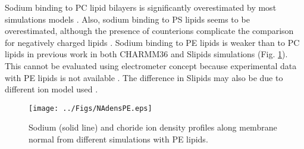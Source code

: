 \documentclass[aps,prl,superscriptaddress,twocolumn]{revtex4}
\begin{document}
Sodium binding to PC lipid bilayers is significantly overestimated by most simulations models \cite{catte16}.
Also, sodium binding to PS lipids seems to be overestimated, although the
presence of counterions complicate the comparison for negatively charged lipids \cite{NMRlipidsIVps}.
Sodium binding to PE lipids is weaker than to PC lipids in previous work \cite{catte16} in both CHARMM36 and Slipids simulations (Fig. \ref{NAdensPE}).
This cannot be evaluated using electrometer concept because experimental data with PE lipids is not
available .
The difference in Slipids may also be due to different ion model used .
\begin{figure}[]
  \centering
  \texttt{[image: ../Figs/NAdensPE.eps]}
  \caption{\label{NAdensPE}
    Sodium (solid line) and choride ion density profiles along membrane normal
    from different simulations with PE lipids.
  }
\end{figure}
\end{document}
